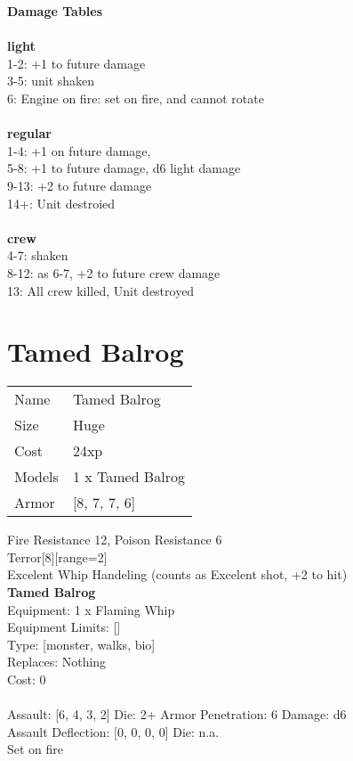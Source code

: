 {\bf Damage Tables} \\
\ \\ {\bf light } \\
1-2: +1 to future damage \\
3-5: unit shaken \\
6: Engine on fire: set on fire, and cannot rotate \\
\ \\ {\bf regular } \\
1-4: +1 on future damage, \\
5-8: +1 to future damage, d6 light damage \\
9-13: +2 to future damage \\
14+: Unit destroied \\
\ \\ {\bf crew } \\
4-7: shaken \\
8-12: as 6-7, +2 to future crew damage \\
13: All crew killed, Unit destroyed \\










\pagebreak\pagebreak

\section{ Tamed Balrog }

\begin{tabular}{ll}
  Name & Tamed Balrog \\
  Size & Huge\\
  Cost & 24xp\\
  Models & 1 x Tamed Balrog\\
  Armor & [8, 7, 7, 6]\\
\end{tabular}

\noindent Fire Resistance 12, Poison Resistance 6\\ 
Terror[8][range=2]\\ 
Excelent Whip Handeling (counts as Excelent shot, +2 to hit)\\ 


{\bf Tamed Balrog } \\
Equipment: 1 x Flaming Whip \\
Equipment Limits: [] \\
Type: [monster, walks, bio] \\
Replaces: Nothing \\
Cost: 0\\
\ \\
Assault: [6, 4, 3, 2] Die: 2+ Armor Penetration: 6 Damage: d6 \\
Assault Deflection: [0, 0, 0, 0] Die: n.a.\\
\indent Set on fire\\ 
 
